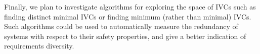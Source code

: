 Finally, we plan to investigate algorithms for exploring the space of IVCs such as finding distinct minimal IVCs or finding minimum (rather than minimal) IVCs. Such algorithms could be used to automatically measure the redundancy of systems with respect to their safety properties, and give a better indication of requirements diversity.  


